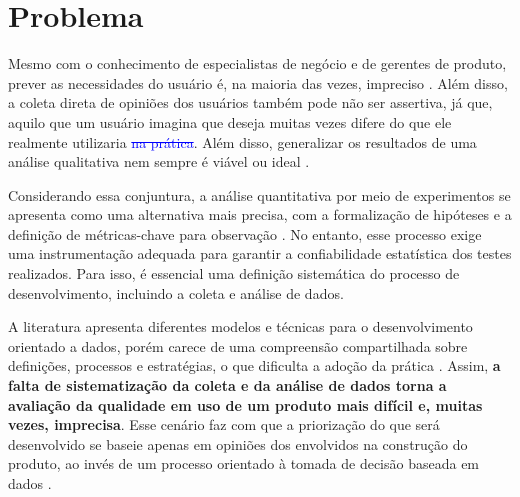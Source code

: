 \section{Problema}

Mesmo com o conhecimento de especialistas de negócio e de gerentes de produto, prever as necessidades do usuário é, na maioria das vezes, impreciso \cite{castellion2008do}. Além disso, a coleta direta de opiniões dos usuários também pode não ser assertiva, já que, aquilo que um usuário imagina que deseja muitas vezes difere do que ele realmente utilizaria \textcolor{blue}{\st{na prática}}. Além disso, generalizar os resultados de uma análise qualitativa nem sempre é viável ou ideal \cite{cao2008agile}.

Considerando essa conjuntura, a análise quantitativa por meio de experimentos se apresenta como uma alternativa mais precisa, com a formalização de hipóteses e a definição de métricas-chave para observação \cite{kohavi_oce_and_ab_tests_2017}. No entanto, esse processo exige uma instrumentação adequada para garantir a confiabilidade estatística dos testes realizados. Para isso, é essencial uma definição sistemática do processo de desenvolvimento, incluindo a coleta e análise de dados.

A literatura apresenta diferentes modelos e técnicas para o desenvolvimento orientado a dados, porém carece de uma compreensão compartilhada sobre definições, processos e estratégias, o que dificulta a adoção da prática \cite{quin_b_2024}. Assim, \textbf{a falta de sistematização da coleta e da análise de dados torna a avaliação da qualidade em uso de um produto mais difícil e, muitas vezes, imprecisa}. Esse cenário faz com que a priorização do que será desenvolvido se baseie apenas em opiniões dos envolvidos na construção do produto, ao invés de um processo orientado à tomada de decisão baseada em dados \cite{olsson_opinions_2014}.
